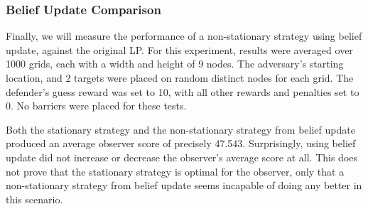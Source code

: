 \subsubsection{Belief Update Comparison}
Finally, we will measure the performance of a non-stationary strategy using belief update, against the original LP. For this experiment, results were averaged over 1000 grids, each with a width and height of 9 nodes. The adversary's starting location, and 2 targets were placed on random distinct nodes for each grid. The defender's guess reward was set to 10, with all other rewards and penalties set to 0. No barriers were placed for these tests. 

Both the stationary strategy and the non-stationary strategy from belief update produced an average observer score of precisely 47.543. Surprisingly, using belief update did not increase or decrease the observer's average score at all. This does not prove that the stationary strategy is optimal for the observer, only that a non-stationary strategy from belief update seems incapable of doing any better in this scenario. 




\nocite{Dijkstra80}
\nocite{plop03-paper}
